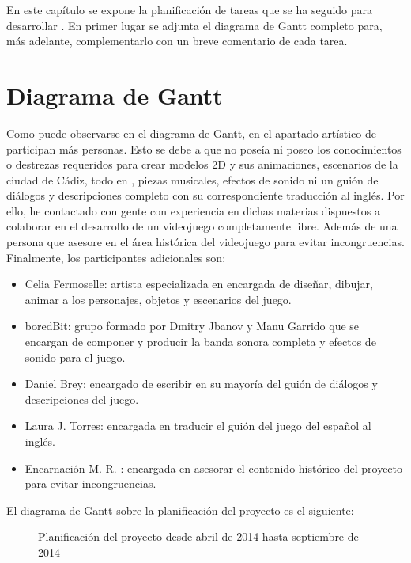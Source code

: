 


En este capítulo se expone la planificación de tareas que se ha seguido para desarrollar \nombrejuego{}. En primer lugar se adjunta el diagrama de Gantt completo para, más adelante, complementarlo con un breve comentario de cada tarea.

\section{Diagrama de Gantt}
Como puede observarse en el diagrama de Gantt, en el apartado artístico de \nombrejuego{} participan más personas. Esto se debe a que no poseía ni poseo los conocimientos o destrezas requeridos para crear modelos 2D y sus animaciones, escenarios de la ciudad de Cádiz, todo en , piezas musicales, efectos de sonido ni un guión de diálogos y descripciones completo con su correspondiente traducción al inglés. Por ello, he contactado con gente con experiencia en dichas materias dispuestos a colaborar en el desarrollo de un videojuego completamente libre. Además de una persona que asesore en el área histórica del videojuego para evitar incongruencias. Finalmente, los participantes adicionales son:

\begin{itemize}
\item Celia Fermoselle: artista especializada en encargada de diseñar, dibujar, animar a los personajes, objetos y escenarios del juego.
\item boredBit: grupo formado por Dmitry Jbanov y Manu Garrido que se encargan de componer y producir la banda sonora completa y efectos de sonido para el juego.
\item Daniel Brey: encargado de escribir en su mayoría del guión de diálogos y descripciones del juego.
\item Laura J. Torres: encargada en traducir el guión del juego del español al inglés.
\item Encarnación M. R. : encargada en asesorar el contenido histórico del proyecto para evitar incongruencias.
\end{itemize}

El diagrama de Gantt sobre la planificación del proyecto es el siguiente:

\begin{figure}[H] 
  \begin{center}
  \end{center}
  \caption{Planificación del proyecto desde abril de 2014 hasta septiembre de 2014}
    \label{fig:gantt}
\end{figure}


